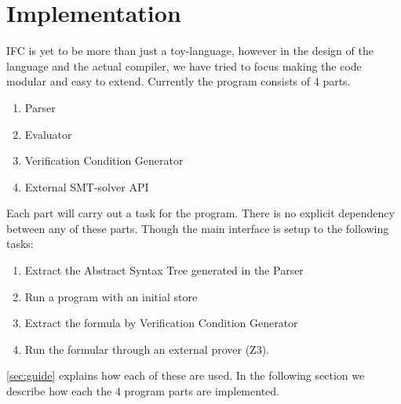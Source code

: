 \section{Implementation}\label{sec:implementation}
IFC is yet to be more than just a toy-language, however in the design of the language and the actual compiler, we have tried to focus making the code modular and easy to extend.
Currently the program consists of 4 parts.
\begin{enumerate}
  \item Parser
  \item Evaluator
  \item Verification Condition Generator
  \item External SMT-solver API
\end{enumerate}
Each part will carry out a task for the program. There is no explicit dependency between any of these parts. Though the main interface is setup to the following tasks:
\begin{enumerate}
  \item Extract the Abstract Syntax Tree generated in the Parser
  \item Run a program with an initial store
  \item Extract the formula by Verification Condition Generator
  \item Run the formular through an external prover (Z3).
\end{enumerate}
\autoref{sec:guide} explains how each of these are used. In the following section we describe how each the 4 program parts are implemented.








